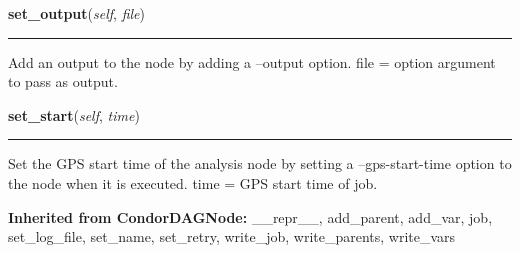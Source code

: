     \label{pipeline:AnalysisNode:set_output}
    \vspace{0.5ex}

    \noindent\begin{boxedminipage}{\textwidth}

    \raggedright \textbf{set\_output}(\textit{self}, \textit{file})

    \vspace{-1.5ex}

    \rule{\textwidth}{0.5\fboxrule}
    Add an output to the node by adding a --output option. file = option 
    argument to pass as output.

    \vspace{1ex}

    \end{boxedminipage}

    \label{pipeline:AnalysisNode:set_start}
    \vspace{0.5ex}

    \noindent\begin{boxedminipage}{\textwidth}

    \raggedright \textbf{set\_start}(\textit{self}, \textit{time})

    \vspace{-1.5ex}

    \rule{\textwidth}{0.5\fboxrule}
    Set the GPS start time of the analysis node by setting a 
    --gps-start-time option to the node when it is executed. time = GPS 
    start time of job.

    \vspace{1ex}

    \end{boxedminipage}

  \textbf{Inherited from CondorDAGNode:}
    \_\_repr\_\_,
    add\_parent,
    add\_var,
    job,
    set\_log\_file,
    set\_name,
    set\_retry,
    write\_job,
    write\_parents,
    write\_vars


